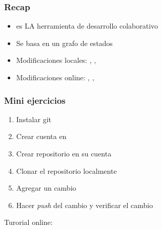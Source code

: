 \documentclass[14pt,aspectratio=169,xcolor=dvipsnames]{beamer}
\begin{document}
\begin{frame}\frametitle{Recap}
    \begin{itemize}
        \item {} es LA herramienta de desarrollo colaborativo
        \item Se basa en un grafo de estados
        \item Modificaciones locales: , , 
        \item Modificaciones online: , , 
    \end{itemize}
\end{frame}
\begin{frame}
    \maketitle
\end{frame}
\begin{frame}[noframenumbering]\frametitle{Mini ejercicios}
    \begin{enumerate}
        \item Instalar git
        \item Crear cuenta en 
        \item Crear repositorio en su cuenta
        \item Clonar el repositorio localmente
        \item Agregar un cambio
        \item Hacer \emph{push} del cambio y verificar el cambio
    \end{enumerate}
    
    \begin{center}
        Turorial online: 
    \end{center}
\end{frame}
\end{document}

